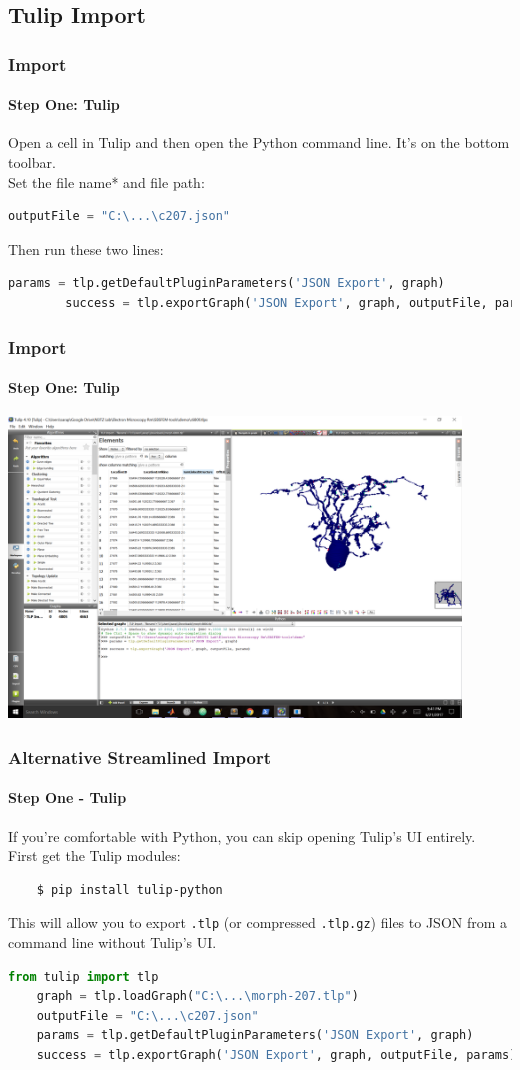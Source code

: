 \documentclass[11pt]{beamer}
\begin{document}
\subsection*{Tulip Import}
\begin{frame}[fragile]
	\frametitle{Import}
	\framesubtitle{Step One: Tulip}
	\begin{block}{}
		Open a cell in Tulip and then open the Python command line. It's on the bottom toolbar.\\
		Set the file name* and file path:
		\begin{lstlisting}[language=python]
		outputFile = "C:\...\c207.json"\end{lstlisting}
		Then run these two lines:
		\begin{lstlisting}[language=python]
		params = tlp.getDefaultPluginParameters('JSON Export', graph)
		success = tlp.exportGraph('JSON Export', graph, outputFile, params)\end{lstlisting}
	\end{block}
\end{frame}
\begin{frame}
	\frametitle{Import}
	\framesubtitle{Step One: Tulip}
	\includegraphics[width = 0.9\textwidth]{tulip_python}
\end{frame}
\begin{frame}[fragile]
	\frametitle{Alternative Streamlined Import}
	\framesubtitle{Step One - Tulip}
	If you're comfortable with Python, you can skip opening Tulip's UI entirely.\\
	First get the Tulip modules:
	\begin{lstlisting}
	$ pip install tulip-python\end{lstlisting}
	This will allow you to export \texttt{.tlp} (or compressed \texttt{.tlp.gz}) files to JSON from a command line without Tulip's UI.
	\begin{lstlisting}[language=python]
	from tulip import tlp
	graph = tlp.loadGraph("C:\...\morph-207.tlp")
	outputFile = "C:\...\c207.json"
	params = tlp.getDefaultPluginParameters('JSON Export', graph)
	success = tlp.exportGraph('JSON Export', graph, outputFile, params)\end{lstlisting}
\end{frame}
\end{document}
